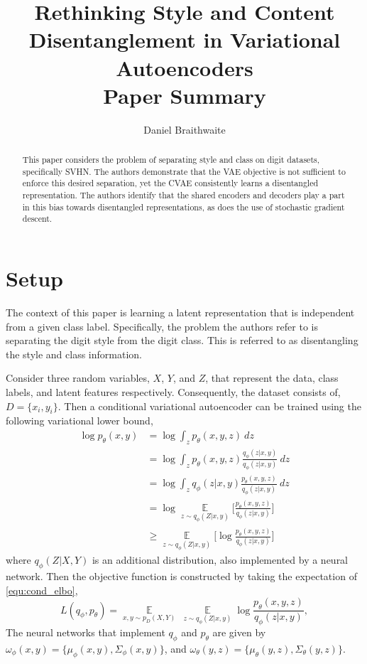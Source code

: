 \documentclass[11pt, a4paper]{article}
\DeclareMathOperator{\EX}{\mathbb{E}}%
\begin{document}
\title{Rethinking Style and Content Disentanglement in Variational Autoencoders\\ \vspace{0.5cm}
\large Paper Summary}
\author{Daniel Braithwaite}
\date{}

\maketitle

\begin{abstract}
	This paper considers the problem of separating style and class on digit datasets, specifically SVHN. The authors demonstrate that the VAE objective is not sufficient to enforce this desired separation, yet the CVAE consistently learns a disentangled representation. The authors identify that the shared encoders and decoders play a part in this bias towards disentangled representations, as does the use of stochastic gradient descent.
\end{abstract}
\vspace{1cm}

\section{Setup}
The context of this paper is learning a latent representation that is independent from a given class label. Specifically, the problem the authors refer to is separating the digit style from the digit class. This is referred to as disentangling the style and class information.

Consider three random variables, $X$, $Y$, and $Z$, that represent the data, class labels, and latent features respectively. Consequently, the dataset consists of, $D = \{x_i, y_i\}$. Then a conditional variational autoencoder can be trained using the following variational lower bound,
\begin{align}
	\log p_\theta(x,y) &= \log \int_z p_\theta(x,y,z)\ dz\\
	&= \log \int_z p_\theta(x,y,z) \frac{q_\phi(z|x,y)}{q_\phi(z|x,y)}\ dz\\
	&= \log \int_z q_\phi(z|x,y) \frac{p_\theta(x,y,z)}{q_\phi(z|x,y)}\ dz\\
	&= \log \underset{z \sim q_\phi(Z|x,y)}{\EX}\Big[ \frac{p_\theta(x,y,z)}{q_\phi(z|x,y)} \Big]\\
	&\geq \underset{z \sim q_\phi(Z|x,y)}{\EX} \Big[ \log \frac{p_\theta(x,y,z)}{q_\phi(z|x,y)} \Big]
	\label{equ:cond_elbo}
\end{align}
where $q_\phi(Z|X,Y)$ is an additional distribution, also implemented by a neural network. Then the objective function is constructed by taking the expectation of \eqref{equ:cond_elbo},
\begin{equation}
\label{equ:cvae_obj}
	L(q_\phi,p_\theta) = \underset{x, y \sim p_D(X,Y)}{\EX}\ \underset{z \sim q_\phi(Z|x,y)}{\EX} \log \frac{p_\theta(x,y,z)}{q_\phi(z|x,y)},
\end{equation}
The neural networks that implement $q_\phi$ and $p_\theta$ are given by $\omega_\phi(x,y) = \{ \mu_\phi(x,y), \Sigma_\phi(x,y) \}$, and $\omega_\theta(y,z) = \{ \mu_\theta(y, z), \Sigma_\theta(y, z) \}$.
\end{document}
